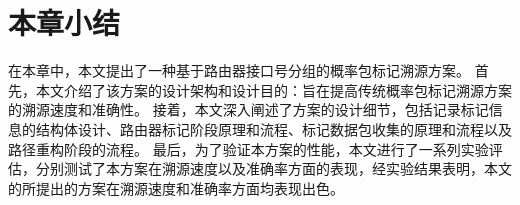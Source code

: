 \section{本章小结}
在本章中，本文提出了一种基于路由器接口号分组的概率包标记溯源方案。
首先，本文介绍了该方案的设计架构和设计目的：旨在提高传统概率包标记溯源方案的溯源速度和准确性。
接着，本文深入阐述了方案的设计细节，包括记录标记信息的结构体设计、路由器标记阶段原理和流程、标记数据包收集的原理和流程以及路径重构阶段的流程。
最后，为了验证本方案的性能，本文进行了一系列实验评估，分别测试了本方案在溯源速度以及准确率方面的表现，经实验结果表明，本文的所提出的方案在溯源速度和准确率方面均表现出色。

 




